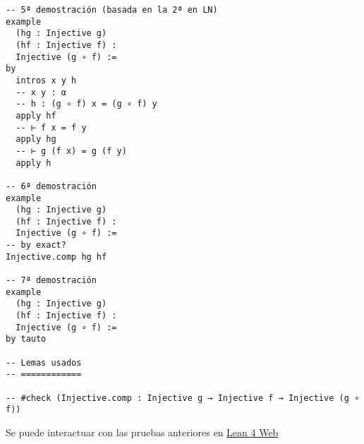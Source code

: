 \begin{verbatim}
-- 5ª demostración (basada en la 2ª en LN)
example
  (hg : Injective g)
  (hf : Injective f) :
  Injective (g ∘ f) :=
by
  intros x y h
  -- x y : α
  -- h : (g ∘ f) x = (g ∘ f) y
  apply hf
  -- ⊢ f x = f y
  apply hg
  -- ⊢ g (f x) = g (f y)
  apply h

-- 6ª demostración
example
  (hg : Injective g)
  (hf : Injective f) :
  Injective (g ∘ f) :=
-- by exact?
Injective.comp hg hf

-- 7ª demostración
example
  (hg : Injective g)
  (hf : Injective f) :
  Injective (g ∘ f) :=
by tauto

-- Lemas usados
-- ============

-- #check (Injective.comp : Injective g → Injective f → Injective (g ∘ f))
\end{verbatim}
Se puede interactuar con las pruebas anteriores en \href{https://lean.math.hhu.de/\#url=https://raw.githubusercontent.com/jaalonso/Calculemus2/main/src/Composicion\_de\_funciones\_inyectivas.lean}{Lean 4 Web}

